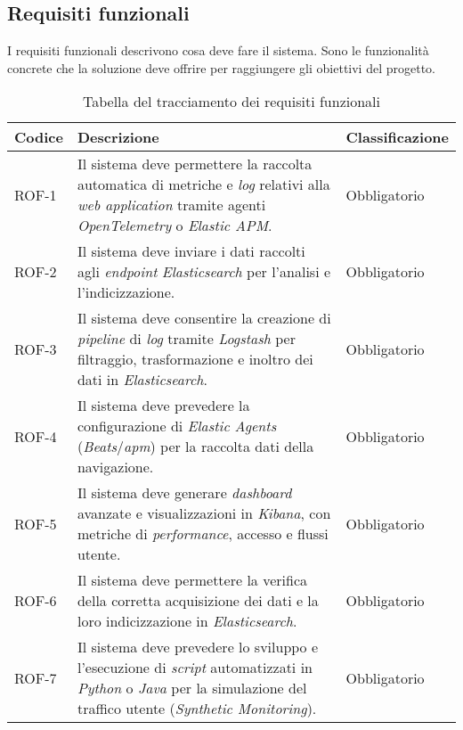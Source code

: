 \newpage
\subsection{Requisiti funzionali}
I requisiti funzionali descrivono cosa deve fare il sistema.
Sono le funzionalità concrete che la soluzione deve offrire per raggiungere gli obiettivi del progetto.

\begin{table}[h]
\caption{Tabella del tracciamento dei requisiti funzionali}
\label{tab:requisiti-funzionali}
\begin{tabularx}{\textwidth}{lXl}
\hline
\rowcolor[gray]{0.8}
\textbf{Codice} & \textbf{Descrizione} & \textbf{Classificazione}\\
\hline
ROF-1     & Il sistema deve permettere la raccolta automatica di metriche e \emph{log} relativi alla \emph{web application} tramite agenti \emph{OpenTelemetry} o \emph{Elastic APM}. & Obbligatorio \\
\hline

\hline
ROF-2     & Il sistema deve inviare i dati raccolti agli \emph{endpoint} \emph{Elasticsearch} per l'analisi e l'indicizzazione. & Obbligatorio \\
\hline

\hline
ROF-3     & Il sistema deve consentire la creazione di \emph{pipeline} di \emph{log} tramite \emph{Logstash} per filtraggio, trasformazione e inoltro dei dati in \emph{Elasticsearch}. & Obbligatorio \\
\hline

\hline
ROF-4     & Il sistema deve prevedere la configurazione di \emph{Elastic Agents} (\emph{Beats}/\emph{\gls{apm}}) per la raccolta dati della navigazione. & Obbligatorio \\
\hline

\hline
ROF-5     & Il sistema deve generare \emph{dashboard} avanzate e visualizzazioni in \emph{Kibana}, con metriche di \emph{performance}, accesso e flussi utente. & Obbligatorio \\
\hline

\hline
ROF-6     & Il sistema deve permettere la verifica della corretta acquisizione dei dati e la loro indicizzazione in \emph{Elasticsearch}. & Obbligatorio \\
\hline

\hline
ROF-7     & Il sistema deve prevedere lo sviluppo e l'esecuzione di \emph{script} automatizzati in \emph{Python} o \emph{Java} per la simulazione del traffico utente (\emph{Synthetic Monitoring}). & Obbligatorio \\
\hline


\end{tabularx}
\end{table}

